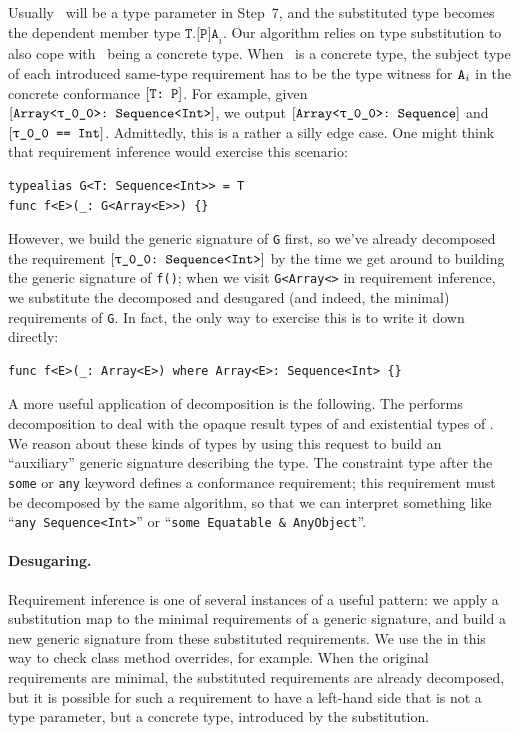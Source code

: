 \documentclass[../generics]{subfiles}
\begin{document}
Usually \tT\ will be a type parameter in Step~7, and the substituted type becomes the dependent member type $\texttt{T.[P]A}_i$. Our algorithm relies on type substitution to also cope with \tT\ being a concrete type. When \tT\ is a concrete type, the subject type of each introduced same-type requirement has to be the type witness for $\texttt{A}_i$ in the concrete conformance $[\texttt{T:~P}]$. For example, given $\ConfReq{Array<\rT>}{Sequence<Int>}$, we output $\ConfReq{Array<\rT>}{Sequence}$ and $\SameReq{\rT}{Int}$. Admittedly, this is a rather a silly edge case. One might think that requirement inference would exercise this scenario:
\begin{Verbatim}
typealias G<T: Sequence<Int>> = T
func f<E>(_: G<Array<E>>) {}
\end{Verbatim}
However, we build the generic signature of \texttt{G} first, so we've already decomposed the requirement $\ConfReq{\rT}{Sequence<Int>}$ by the time we get around to building the generic signature of \texttt{f()}; when we visit \texttt{G<Array<\rT>} in requirement inference, we substitute the decomposed and desugared (and indeed, the minimal) requirements of \texttt{G}. In fact, the only way to exercise this is to write it down directly:
\begin{Verbatim}
func f<E>(_: Array<E>) where Array<E>: Sequence<Int> {}
\end{Verbatim}

A more useful application of decomposition is the following. The  performs decomposition to deal with the opaque result types of  and existential types of . We reason about these kinds of types by using this request to build an ``auxiliary'' generic signature describing the type. The constraint type after the \texttt{some} or \texttt{any} keyword defines a conformance requirement; this requirement must be decomposed by the same algorithm, so that we can interpret something like ``\texttt{any Sequence<Int>}'' or ``\verb|some Equatable & AnyObject|''.

\paragraph{Desugaring.}
Requirement inference is one of several instances of a useful pattern: we apply a substitution map to the minimal requirements of a generic signature, and build a new generic signature from these substituted requirements. We use the  in this way to check class method overrides, for example. When the original requirements are minimal, the substituted requirements are already decomposed, but it is possible for such a requirement to have a left-hand side that is not a type parameter, but a concrete type, introduced by the substitution.
\end{document}
